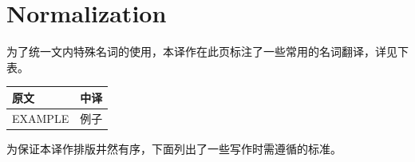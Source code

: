 \chapter{Normalization}

为了统一文内特殊名词的使用，本译作在此页标注了一些常用的名词翻译，详见下表。

\begin{table}[h]
    \footnotesize
    \begin{tabularx}{\linewidth}{X X}
        \toprule
        \textbf{原文} & \textbf{中译}\\
        \midrule
        EXAMPLE & 例子 \\
        \bottomrule
    \end{tabularx}
\end{table}

为保证本译作排版井然有序，下面列出了一些写作时需遵循的标准。
